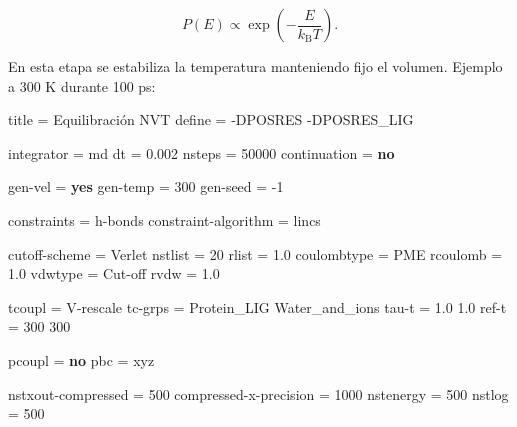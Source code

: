 \documentclass[
  spanish,
  11pt,
  a4paper]{article}
\newenvironment{Shaded}{\begin{snugshade}}{\end{snugshade}}
\newcommand{\DataTypeTok}[1]{\textcolor[rgb]{0.13,0.29,0.53}{#1}}
\newcommand{\DecValTok}[1]{\textcolor[rgb]{0.00,0.00,0.81}{#1}}
\newcommand{\FloatTok}[1]{\textcolor[rgb]{0.00,0.00,0.81}{#1}}
\newcommand{\KeywordTok}[1]{\textcolor[rgb]{0.13,0.29,0.53}{\textbf{#1}}}
\newcommand{\OtherTok}[1]{\textcolor[rgb]{0.56,0.35,0.01}{#1}}
\newcommand{\StringTok}[1]{\textcolor[rgb]{0.31,0.60,0.02}{#1}}
\begin{document}
\[
P(E)\propto \exp\left(-\frac{E}{k_{\mathrm B}T}\right).
\]

En esta etapa se estabiliza la temperatura manteniendo fijo el volumen.
Ejemplo a 300 K durante 100 ps:

\begin{Shaded}
\begin{Highlighting}[]
\DataTypeTok{title                    }\OtherTok{=}\StringTok{ Equilibración NVT}
\DataTypeTok{define                   }\OtherTok{=}\StringTok{ {-}DPOSRES {-}DPOSRES\_LIG}

\DataTypeTok{integrator               }\OtherTok{=}\StringTok{ md}
\DataTypeTok{dt                       }\OtherTok{=}\StringTok{ }\FloatTok{0.002}
\DataTypeTok{nsteps                   }\OtherTok{=}\StringTok{ }\DecValTok{50000}
\DataTypeTok{continuation             }\OtherTok{=}\StringTok{ }\KeywordTok{no}

\DataTypeTok{gen{-}vel                  }\OtherTok{=}\StringTok{ }\KeywordTok{yes}
\DataTypeTok{gen{-}temp                 }\OtherTok{=}\StringTok{ }\DecValTok{300}
\DataTypeTok{gen{-}seed                 }\OtherTok{=}\StringTok{ }\DecValTok{{-}1}

\DataTypeTok{constraints              }\OtherTok{=}\StringTok{ h{-}bonds}
\DataTypeTok{constraint{-}algorithm     }\OtherTok{=}\StringTok{ lincs}

\DataTypeTok{cutoff{-}scheme            }\OtherTok{=}\StringTok{ Verlet}
\DataTypeTok{nstlist                  }\OtherTok{=}\StringTok{ }\DecValTok{20}
\DataTypeTok{rlist                    }\OtherTok{=}\StringTok{ }\FloatTok{1.0}
\DataTypeTok{coulombtype              }\OtherTok{=}\StringTok{ PME}
\DataTypeTok{rcoulomb                 }\OtherTok{=}\StringTok{ }\FloatTok{1.0}
\DataTypeTok{vdwtype                  }\OtherTok{=}\StringTok{ Cut{-}off}
\DataTypeTok{rvdw                     }\OtherTok{=}\StringTok{ }\FloatTok{1.0}

\DataTypeTok{tcoupl                   }\OtherTok{=}\StringTok{ V{-}rescale}
\DataTypeTok{tc{-}grps                  }\OtherTok{=}\StringTok{ Protein\_LIG Water\_and\_ions}
\DataTypeTok{tau{-}t                    }\OtherTok{=}\StringTok{ 1.0 1.0}
\DataTypeTok{ref{-}t                    }\OtherTok{=}\StringTok{ 300 300}

\DataTypeTok{pcoupl                   }\OtherTok{=}\StringTok{ }\KeywordTok{no}
\DataTypeTok{pbc                      }\OtherTok{=}\StringTok{ xyz}

\DataTypeTok{nstxout{-}compressed       }\OtherTok{=}\StringTok{ }\DecValTok{500}
\DataTypeTok{compressed{-}x{-}precision   }\OtherTok{=}\StringTok{ }\DecValTok{1000}
\DataTypeTok{nstenergy                }\OtherTok{=}\StringTok{ }\DecValTok{500}
\DataTypeTok{nstlog                   }\OtherTok{=}\StringTok{ }\DecValTok{500}
\end{Highlighting}
\end{Shaded}
\end{document}
